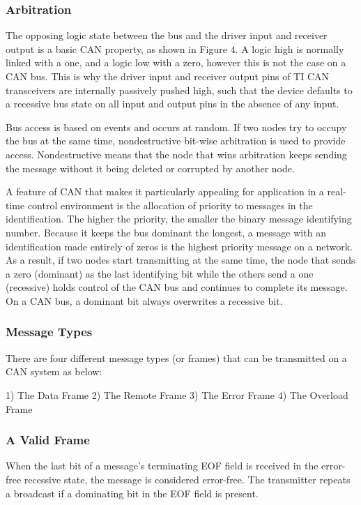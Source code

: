 \subsubsection{Arbitration}

The opposing logic state between the bus and the driver input and receiver output is a basic CAN property, as shown in Figure 4. A logic high is normally linked with a one, and a logic low with a zero, however this is not the case on a CAN bus. This is why the driver input and receiver output pins of TI CAN transceivers are internally passively pushed high, such that the device defaults to a recessive bus state on all input and output pins in the absence of any input.

Bus access is based on events and occurs at random. If two nodes try to occupy the bus at the same time, nondestructive bit-wise arbitration is used to provide access. Nondestructive means that the node that wins arbitration keeps sending the message without it being deleted or corrupted by another node.

A feature of CAN that makes it particularly appealing for application in a real-time control environment is the allocation of priority to messages in the identification. The higher the priority, the smaller the binary message identifying number. Because it keeps the bus dominant the longest, a message with an identification made entirely of zeros is the highest priority message on a network. As a result, if two nodes start transmitting at the same time, the node that sends a zero (dominant) as the last identifying bit while the others send a one (recessive) holds control of the CAN bus and continues to complete its message. On a CAN bus, a dominant bit always overwrites a recessive bit.

\subsubsection{Message Types}
There are four different message types (or frames) that can be transmitted on a CAN system as below:

1) The Data Frame
2) The Remote Frame
3) The Error Frame
4) The Overload Frame


\subsubsection{A Valid Frame}

When the last bit of a message's terminating EOF field is received in the error-free recessive state, the message is considered error-free. The transmitter repeats a broadcast if a dominating bit in the EOF field is present.

